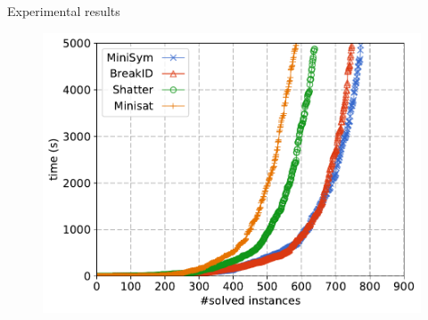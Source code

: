 \documentclass{beamer}
\begin{document}
\begin{frame}{Experimental results}

\begin{figure}[t]
\centering
	{\includegraphics[scale=0.45]{images/bliss-result}}
\label{fig:cactus}%
\end{figure}

\begin{table}
%
%
%	


\end{table}
\end{frame}
\end{document}

